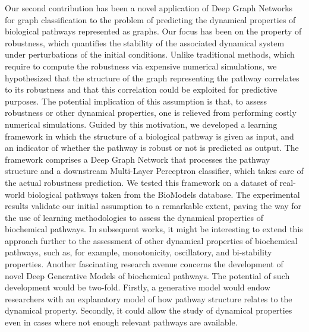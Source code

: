 Our second contribution has been a novel application of Deep Graph Networks for graph classification to the problem of predicting the dynamical properties of biological pathways represented as graphs. Our focus has been on the property of robustness, which quantifies the stability of the associated dynamical system under perturbations of the initial conditions. Unlike traditional methods, which require to compute the robustness via expensive numerical simulations, we hypothesized that the structure of the graph representing the pathway correlates to its robustness and that this correlation could be exploited for predictive purposes. The potential implication of this assumption is that, to assess robustness or other dynamical properties, one is relieved from performing costly numerical simulations. Guided by this motivation, we developed a learning framework in which the structure of a biological pathway is given as input, and an indicator of whether the pathway is robust or not is predicted as output. The framework comprises a Deep Graph Network that processes the pathway structure and a downstream Multi-Layer Perceptron classifier, which takes care of the actual robustness prediction. We tested this framework on a dataset of real-world biological pathways taken from the BioModels database. The experimental results validate our initial assumption to a remarkable extent, paving the way for the use of learning methodologies to assess the dynamical properties of biochemical pathways. In subsequent works, it might be interesting to extend this approach further to the assessment of other dynamical properties of biochemical pathways, such as, for example, monotonicity, oscillatory, and bi-stability properties. Another fascinating research avenue concerns the development of novel Deep Generative Models of biochemical pathways. The potential of such development would be two-fold. Firstly, a generative model would endow researchers with an explanatory model of how pathway structure relates to the dynamical property. Secondly, it could allow the study of dynamical properties even in cases where not enough relevant pathways are available.
\vspace{1em}

